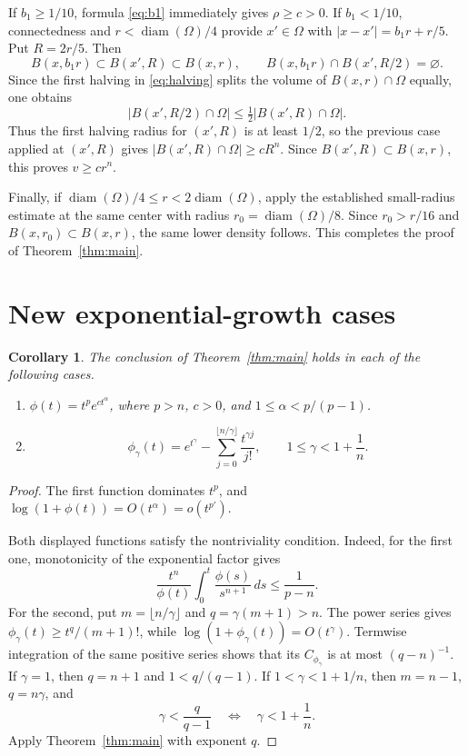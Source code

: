 \documentclass[11pt]{article}
\newtheorem{corollary}{Corollary}
\begin{document}
If $b_1\geq1/10$, formula \eqref{eq:b1} immediately gives $\rho\geq c>0$.
If $b_1<1/10$, connectedness and $r<\operatorname{diam}(\Omega)/4$ provide
$x'\in\Omega$ with
$|x-x'|=b_1r+r/5$.  Put $R=2r/5$.  Then
\[
 B(x,b_1r)\subset B(x',R)\subset B(x,r),
 \qquad B(x,b_1r)\cap B(x',R/2)=\varnothing.
\]
Since the first halving in \eqref{eq:halving} splits the volume of
$B(x,r)\cap\Omega$ equally, one obtains
\[
 |B(x',R/2)\cap\Omega|\leq\tfrac12|B(x',R)\cap\Omega|.
\]
Thus the first halving radius for $(x',R)$ is at least $1/2$, so the previous
case applied at $(x',R)$ gives
$|B(x',R)\cap\Omega|\geq cR^n$.  Since $B(x',R)\subset B(x,r)$, this proves
$v\geq c r^n$.

Finally, if $\operatorname{diam}(\Omega)/4\leq r<2\operatorname{diam}(\Omega)$,
apply the established small-radius estimate at the same center with radius
$r_0=\operatorname{diam}(\Omega)/8$.  Since $r_0>r/16$ and
$B(x,r_0)\subset B(x,r)$, the same lower density follows.  This completes the
proof of Theorem~\ref{thm:main}.

\section*{New exponential-growth cases}

\begin{corollary}\label{cor:examples}
The conclusion of Theorem~\ref{thm:main} holds in each of the following cases.
\begin{enumerate}
\item $\phi(t)=t^p e^{ct^\alpha}$, where $p>n$, $c>0$, and
$1\leq\alpha<p/(p-1)$.
\item
\[
 \phi_\gamma(t)=e^{t^\gamma}
 -\sum_{j=0}^{\lfloor n/\gamma\rfloor}\frac{t^{\gamma j}}{j!},
 \qquad 1\leq\gamma<1+\frac1n.
\]
\end{enumerate}
\end{corollary}

\begin{proof}
The first function dominates $t^p$, and
$\log(1+\phi(t))=O(t^\alpha)=o(t^{p'})$.

Both displayed functions satisfy the nontriviality condition.  Indeed, for
the first one, monotonicity of the exponential factor gives
\[
 \frac{t^n}{\phi(t)}\int_0^t\frac{\phi(s)}{s^{n+1}}\,ds
 \leq \frac1{p-n}.
\]
For the second, put $m=\lfloor n/\gamma\rfloor$ and
$q=\gamma(m+1)>n$.  The power series gives
$\phi_\gamma(t)\geq t^q/(m+1)!$, while
$\log(1+\phi_\gamma(t))=O(t^\gamma)$.  Termwise integration of the same
positive series shows that its $C_{\phi_\gamma}$ is at most $(q-n)^{-1}$.
If $\gamma=1$, then $q=n+1$ and
$1<q/(q-1)$.  If $1<\gamma<1+1/n$, then $m=n-1$, $q=n\gamma$, and
\[
 \gamma<\frac{q}{q-1}
 \quad\Longleftrightarrow\quad
 \gamma<1+\frac1n.
\]
Apply Theorem~\ref{thm:main} with exponent $q$.
\end{proof}
\end{document}
